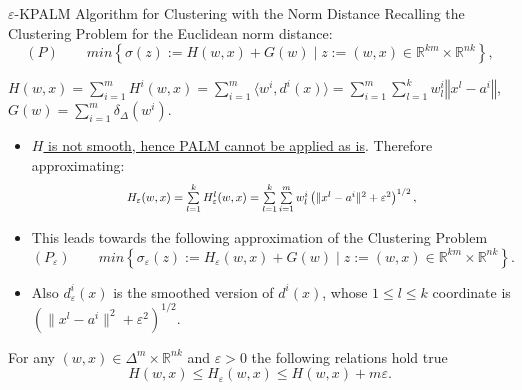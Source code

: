 \documentclass[9pt,handout]{beamer} %
\newcommand{\R}{\mathbb{R}} %
\newcommand{\norm}[1]{\left\Vert {#1} \right\Vert} %
\begin{document}
	\begin{frame}{$\varepsilon$-KPALM Algorithm for Clustering with the Norm Distance}
		Recalling the Clustering Problem for the Euclidean norm distance:
		\begin{equation*}
				(P) \qquad min \left\lbrace \sigma(z) := H(w,x) + G(w) \mid z := (w,x) \in \R^{km} \times \R^{nk} \right\rbrace, 
		\end{equation*}
		\begin{center}
		$H(w,x) = \sum\limits_{i=1}^{m} H^i(w,x) = \sum\limits_{i=1}^{m} \langle w^i , d^i(x) \rangle = \sum\limits_{i=1}^m\sum\limits_{l=1}^k w^i_l \norm{x^l - a^i}$, $G(w) = \sum\limits_{i=1}^{m} \delta_{\Delta}(w^i)$.\\
		\end{center}
		\begin{itemize}[<+->]
			\item \underline{$H$ is not smooth, hence PALM cannot be applied as is}. Therefore approximating:
			\begin{equation*}
				\resizebox{.6\hsize}{!}{$H_{\varepsilon}(w,x) = \sum\limits_{l=1}^{k} H^l_{\varepsilon}(w,x)
	= \sum\limits_{l=1}^{k} \sum\limits_{i=1}^{m} w^i_l \left( \| x^l - a^i \|^2 + {\varepsilon}^2 \right)^{1/2},$}
			\end{equation*}
			\item This leads towards the following approximation of the Clustering Problem
			\begin{equation*}
				(P_{\varepsilon}) \qquad min \left\lbrace \sigma_{\varepsilon}(z) := H_{\varepsilon}(w,x) + G(w) \mid z := (w,x) \in \R^{km} \times \R^{nk} \right\rbrace.
			\end{equation*}
			\item Also $d^i_{\varepsilon}(x)$ is the smoothed version of $d^i(x)$, whose $1 \leq l \leq k$ coordinate is $\left( \|x^l - a^i\|^2 + {\varepsilon}^2 \right)^{1/2}$.
		\end{itemize}
		\pause
		\begin{lemma}
			For any $(w,x) \in {\Delta}^m \times \mathbb{R}^{nk}$ and $\varepsilon > 0$ the following relations hold true
			\begin{equation*}
				H(w,x) \leq H_{\varepsilon}(w,x) \leq H(w,x) + m\varepsilon .
			\end{equation*}
		\end{lemma}
	\end{frame}	
	
\end{document}
